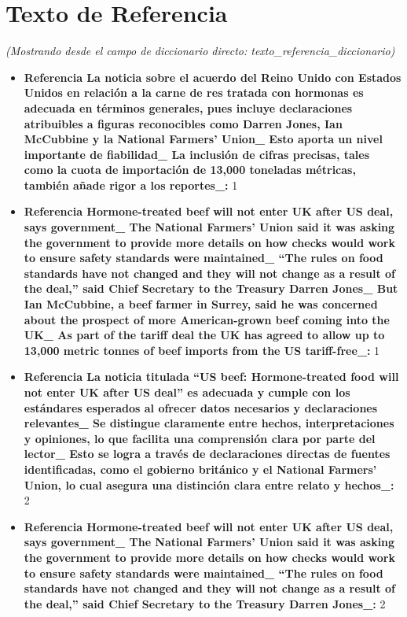 \documentclass[10pt,a4paper]{article}
\begin{document}
\section*{Texto de Referencia}
    \textit{(Mostrando desde el campo de diccionario directo: texto\_referencia\_diccionario)}
    \begin{itemize}[leftmargin=*]
            \item \textbf{Referencia La noticia sobre el acuerdo del Reino Unido con Estados Unidos en relaci\'{o}n a la carne de res tratada con hormonas es adecuada en t\'{e}rminos generales, pues incluye declaraciones atribuibles a figuras reconocibles como Darren Jones, Ian McCubbine y la National Farmers' Union\_ Esto aporta un nivel importante de fiabilidad\_ La inclusi\'{o}n de cifras precisas, tales como la cuota de importaci\'{o}n de 13,000 toneladas m\'{e}tricas, tambi\'{e}n a\~{n}ade rigor a los reportes\_:} 1
            \item \textbf{Referencia Hormone-treated beef will not enter UK after US deal, says government\_ The National Farmers' Union said it was asking the government to provide more details on how checks would work to ensure safety standards were maintained\_ ``The rules on food standards have not changed and they will not change as a result of the deal,'' said Chief Secretary to the Treasury Darren Jones\_ But Ian McCubbine, a beef farmer in Surrey, said he was concerned about the prospect of more American-grown beef coming into the UK\_ As part of the tariff deal the UK has agreed to allow up to 13,000 metric tonnes of beef imports from the US tariff-free\_:} 1
            \item \textbf{Referencia La noticia titulada ``US beef: Hormone-treated food will not enter UK after US deal'' es adecuada y cumple con los est\'{a}ndares esperados al ofrecer datos necesarios y declaraciones relevantes\_ Se distingue claramente entre hechos, interpretaciones y opiniones, lo que facilita una comprensi\'{o}n clara por parte del lector\_ Esto se logra a trav\'{e}s de declaraciones directas de fuentes identificadas, como el gobierno brit\'{a}nico y el National Farmers' Union, lo cual asegura una distinci\'{o}n clara entre relato y hechos\_:} 2
            \item \textbf{Referencia Hormone-treated beef will not enter UK after US deal, says government\_ The National Farmers' Union said it was asking the government to provide more details on how checks would work to ensure safety standards were maintained\_ ``The rules on food standards have not changed and they will not change as a result of the deal,'' said Chief Secretary to the Treasury Darren Jones\_:} 2

\end{itemize}
\end{document}
